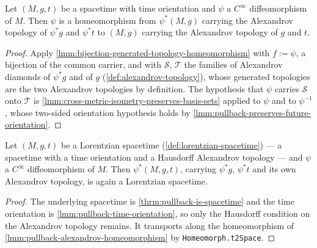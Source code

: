 \begin{lemma}
    \label{lmm:pullback-alexandrov-homeomorphism}
    \leanok
    Let $(M,g,t)$ be a spacetime with time orientation and $\psi$ a $C^\infty$ diffeomorphism of $M$. Then $\psi$ is a homeomorphism from $\psi^*(M,g)$ carrying the Alexandrov topology of $\psi^*g$ and $\psi^*t$ to $(M,g)$ carrying the Alexandrov topology of $g$ and $t$.
\end{lemma}
\begin{proof}
    \leanok
    Apply \ref{lmm:bijection-generated-topology-homeomorphism} with $f := \psi$, a bijection of the common carrier, and with $\mathcal{S}$, $\mathcal{T}$ the families of Alexandrov diamonds of $\psi^*g$ and of $g$ (\ref{def:alexandrov-topology}), whose generated topologies are the two Alexandrov topologies by definition. The hypothesis that $\psi$ carries $\mathcal{S}$ onto $\mathcal{T}$ is \ref{lmm:cross-metric-isometry-preserves-basis-sets} applied to $\psi$ and to $\psi^{-1}$, whose two-sided orientation hypothesis holds by \ref{lmm:pullback-preserves-future-orientation}.
\end{proof}

\medskip

\begin{theorem}
    \label{thrm:pullback-is-lorentzian-spacetime}
    \leanok
    Let $(M,g,t)$ be a Lorentzian spacetime (\ref{def:lorentzian-spacetime}) --- a spacetime with a time orientation and a Hausdorff Alexandrov topology --- and $\psi$ a $C^\infty$ diffeomorphism of $M$. Then $\psi^*(M,g,t)$, carrying $\psi^*g$, $\psi^*t$ and its own Alexandrov topology, is again a Lorentzian spacetime.
\end{theorem}
\begin{proof}
    \leanok
    The underlying spacetime is \ref{thrm:pullback-is-spacetime} and the time orientation is \ref{lmm:pullback-time-orientation}, so only the Hausdorff condition on the Alexandrov topology remains. It transports along the homeomorphism of \ref{lmm:pullback-alexandrov-homeomorphism} by \texttt{Homeomorph.t2Space}.
\end{proof}

